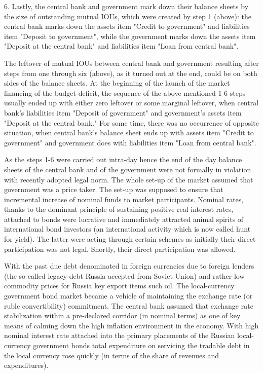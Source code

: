 6.	Lastly, the central bank and government mark down their balance sheets by the size of outstanding mutual IOUs, which were created by step 1 (above): the central bank marks down the assets item "Credit to government" and liabilities item "Deposit to government", while the government marks down the assets item "Deposit at the central bank" and liabilities item "Loan from central bank".

The leftover of mutual IOUs between central bank and government resulting after steps from one through six (above), as it turned out at the end, could be on both sides of the balance sheets. At the beginning of the launch of the market financing of the budget deficit, the sequence of the above-mentioned 1-6 steps usually ended up with either zero leftover or some marginal leftover, when central bank's liabilities item "Deposit of government" and government's assets item "Deposit at the central bank." For some time, there was no occurrence of opposite situation, when central bank's balance sheet ends up with assets item "Credit to government" and government does with liabilities item "Loan from central bank". 

As the steps 1-6 were carried out intra-day hence the end of the day balance sheets of the central bank and of the government were not formally in violation with recently adopted legal norm. The whole set-up of the market assumed that government was a price taker. The set-up was supposed to ensure that incremental increase of nominal funds to market participants. Nominal rates, thanks to the dominant principle of sustaining positive real interest rates, attached to bonds were lucrative and immediately attracted animal spirits of international bond investors (an international activity which is now called hunt for yield). The latter were acting through certain schemes as initially their direct participation was not legal. Shortly, their direct participation was allowed. 

With the past due debt denominated in foreign currencies due to foreign lenders (the so-called legacy debt Russia accepted from Soviet Union) and rather low commodity prices for Russia key export items such oil. The local-currency government bond market became a vehicle of maintaining the exchange rate (or ruble convertibility) commitment. The central bank assumed that exchange rate stabilization within a pre-declared corridor (in nominal terms) as one of key means of calming down the high inflation environment in the economy. With high nominal interest rate attached into the primary placements of the Russian local-currency government bonds total expenditure on servicing the tradable debt in the local currency rose quickly (in terms of the share of revenues and expenditures). 

